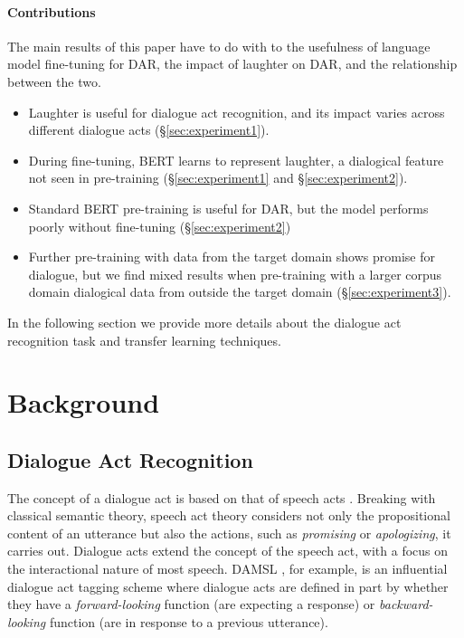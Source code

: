 \documentclass[11pt,a4paper]{article}
\begin{document}
\paragraph{Contributions}
The main results of this paper have to do with to the usefulness of language model fine-tuning for DAR, the impact of laughter on DAR, and the relationship between the two.
\begin{itemize}
  \item Laughter is useful for dialogue act recognition, and its impact varies across different dialogue acts (\S\ref{sec:experiment1}).
  \item During fine-tuning, BERT learns to represent laughter, a dialogical feature not seen in pre-training (\S\ref{sec:experiment1} and \S\ref{sec:experiment2}).
  \item Standard BERT pre-training is useful for DAR, but the model performs poorly without fine-tuning (\S\ref{sec:experiment2})
  \item Further pre-training with data from the target domain shows promise for dialogue, but we find mixed results when pre-training with a larger corpus domain dialogical data from outside the target domain (\S\ref{sec:experiment3}).
  \end{itemize}

In the following section we provide more details about the dialogue act recognition task and transfer learning techniques. 


\section{Background}

\subsection{Dialogue Act Recognition}
The concept of a dialogue act is based on that of speech acts \citep{austinHowThingsWords2009}.
Breaking with classical semantic theory, speech act theory considers not only the propositional content of an utterance but also the actions, such as \emph{promising} or \emph{apologizing}, it carries out.
Dialogue acts extend the concept of the speech act, with a focus on the interactional nature of most speech.
DAMSL \citep{coreCodingDialogsDAMSL1997}, for example, is an influential dialogue act tagging scheme where dialogue acts are defined in part by whether they have a \emph{forward-looking} function (are expecting a response) or \emph{backward-looking} function (are in response to a previous utterance).
\end{document}
